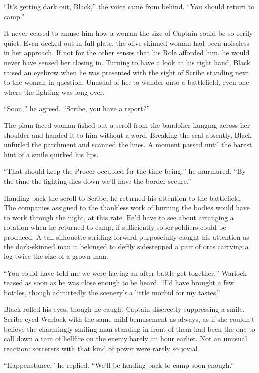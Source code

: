 \documentclass[12pt, openany]{book}
\begin{document}
“It’s getting dark out, Black,” the voice came from behind. “You should return to camp.”

It never ceased to amuse him how a woman the size of Captain could be so eerily quiet. Even decked out in full plate, the olive-skinned woman had been noiseless in her approach. If not for the other senses that his Role afforded him, he would never have sensed her closing in. Turning to have a look at his right hand, Black raised an eyebrow when he was presented with the sight of Scribe standing next to the woman in question. Unusual of her to wander onto a battlefield, even one where the fighting was long over.

“Soon,” he agreed. “Scribe, you have a report?”

The plain-faced woman fished out a scroll from the bandolier hanging across her shoulder and handed it to him without a word. Breaking the seal absently, Black unfurled the parchment and scanned the lines. A moment passed until the barest hint of a smile quirked his lips.

“That should keep the Procer occupied for the time being,” he murmured. “By the time the fighting dies down we’ll have the border secure.”

Handing back the scroll to Scribe, he returned his attention to the battlefield. The companies assigned to the thankless work of burning the bodies would have to work through the night, at this rate. He’d have to see about arranging a rotation when he returned to camp, if sufficiently sober soldiers could be produced. A tall silhouette striding forward purposefully caught his attention as the dark-skinned man it belonged to deftly sidestepped a pair of orcs carrying a log twice the size of a grown man.

“You could have told me we were having an after-battle get together,” Warlock teased as soon as he was close enough to be heard. “I’d have brought a few bottles, though admittedly the scenery’s a little morbid for my tastes.”

Black rolled his eyes, though he caught Captain discreetly suppressing a smile. Scribe eyed Warlock with the same mild bemusement as always, as if she couldn’t believe the charmingly smiling man standing in front of them had been the one to call down a rain of hellfire on the enemy barely an hour earlier. Not an unusual reaction: sorcerers with that kind of power were rarely so jovial.

“Happenstance,” he replied. “We’ll be heading back to camp soon enough.”
\end{document}
